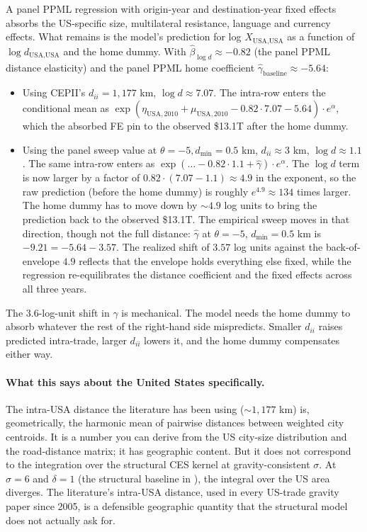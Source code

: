 \documentclass[11pt, letterpaper]{article}
\theoremstyle{definition}
\newcommand{\dii}{d_{ii}}
\begin{document}
A panel PPML regression with origin-year and destination-year fixed
effects absorbs the US-specific size, multilateral resistance,
language and currency effects. What remains is the model's prediction
for log $X_{\text{USA,USA}}$ as a function of $\log d_{\text{USA,USA}}$
and the home dummy. With $\hat\beta_{\log d} \approx -0.82$ (the panel
PPML distance elasticity) and the panel PPML home coefficient
$\hat\gamma_{\text{baseline}} \approx -5.64$:
\begin{itemize}
  \item Using CEPII's $\dii = 1{,}177$ km, $\log d \approx 7.07$. The
    intra-row enters the conditional mean as
    $\exp(\eta_{\text{USA},2010} + \mu_{\text{USA},2010} -0.82 \cdot 7.07 -5.64) \cdot e^\alpha$,
    which the absorbed FE pin to the observed \$13.1T after the home
    dummy.
  \item Using the panel sweep value at $\theta = -5, d_{\min} = 0.5$ km,
    $\dii \approx 3$ km, $\log d \approx 1.1$. The same intra-row enters
    as $\exp(\ldots -0.82 \cdot 1.1 + \hat\gamma) \cdot e^\alpha$. The
    $\log d$ term is now larger by a factor of
    $0.82 \cdot (7.07 - 1.1) \approx 4.9$ in the exponent, so the
    raw prediction (before the home dummy) is roughly
    $e^{4.9} \approx 134$ times larger. The home dummy has to move
    down by $\sim 4.9$ log units to bring the prediction back to the
    observed \$13.1T. The empirical sweep moves in that direction,
    though not the full distance: $\hat\gamma$ at $\theta = -5$,
    $d_{\min} = 0.5$ km is $-9.21 = -5.64 - 3.57$. The realized shift
    of $3.57$ log units against the back-of-envelope $4.9$ reflects
    that the envelope holds everything else fixed, while the
    regression re-equilibrates the distance coefficient and the fixed
    effects across all three years.
\end{itemize}

The 3.6-log-unit shift in $\hat\gamma$ is mechanical. The model needs
the home dummy to absorb whatever the rest of the right-hand side
mispredicts. Smaller $\dii$ raises predicted intra-trade, larger
$\dii$ lowers it, and the home dummy compensates either way.

\paragraph{What this says about the United States specifically.}
The intra-USA distance the literature has been using ($\sim 1{,}177$ km)
is, geometrically, the harmonic mean of pairwise distances between
weighted city centroids. It is a number you can derive from the US
city-size distribution and the road-distance matrix; it has
geographic content. But it does not correspond to the integration
over the structural CES kernel at gravity-consistent $\sigma$. At
$\sigma = 6$ and $\delta = 1$ (the structural baseline in
\citealt{anderson_vanwincoop_2003}), the integral over the US area
diverges. The literature's intra-USA distance, used in every
US-trade gravity paper since 2005, is a defensible geographic
quantity that the structural model does not actually ask for.
\end{document}
